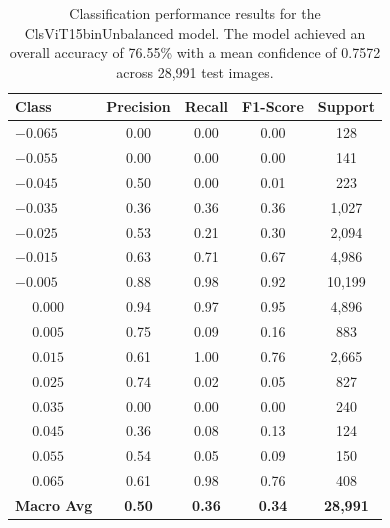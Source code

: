\begin{table}[htbp]
\centering
\begin{tabular}{@{}lcccc@{}}
\toprule
\textbf{Class} & \textbf{Precision} & \textbf{Recall} & \textbf{F1-Score} & \textbf{Support} \\
\midrule
$-0.065$ & 0.00 & 0.00 & 0.00 & 128 \\
$-0.055$ & 0.00 & 0.00 & 0.00 & 141 \\
$-0.045$ & 0.50 & 0.00 & 0.01 & 223 \\
$-0.035$ & 0.36 & 0.36 & 0.36 & 1,027 \\
$-0.025$ & 0.53 & 0.21 & 0.30 & 2,094 \\
$-0.015$ & 0.63 & 0.71 & 0.67 & 4,986 \\
$-0.005$ & 0.88 & 0.98 & 0.92 & 10,199 \\
$\phantom{-}0.000$ & 0.94 & 0.97 & 0.95 & 4,896 \\
$\phantom{-}0.005$ & 0.75 & 0.09 & 0.16 & 883 \\
$\phantom{-}0.015$ & 0.61 & 1.00 & 0.76 & 2,665 \\
$\phantom{-}0.025$ & 0.74 & 0.02 & 0.05 & 827 \\
$\phantom{-}0.035$ & 0.00 & 0.00 & 0.00 & 240 \\
$\phantom{-}0.045$ & 0.36 & 0.08 & 0.13 & 124 \\
$\phantom{-}0.055$ & 0.54 & 0.05 & 0.09 & 150 \\
$\phantom{-}0.065$ & 0.61 & 0.98 & 0.76 & 408 \\
\midrule
\textbf{Macro Avg} & \textbf{0.50} & \textbf{0.36} & \textbf{0.34} & \textbf{28,991} \\
\bottomrule
\end{tabular}
\caption{Classification performance results for the ClsViT15binUnbalanced model. The model achieved an overall accuracy of 76.55\% with a mean confidence of 0.7572 across 28,991 test images.}
\label{tab:clf_report_ClsViT15binUnbalanced}
\end{table}

